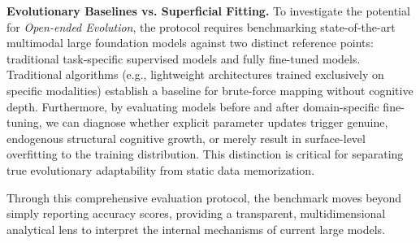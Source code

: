 \textbf{Evolutionary Baselines vs. Superficial Fitting.} 
To investigate the potential for \textit{Open-ended Evolution}, the protocol requires benchmarking state-of-the-art multimodal large foundation models against two distinct reference points: traditional task-specific supervised models and fully fine-tuned models. Traditional algorithms (e.g., lightweight architectures trained exclusively on specific modalities) establish a baseline for brute-force mapping without cognitive depth. Furthermore, by evaluating models before and after domain-specific fine-tuning, we can diagnose whether explicit parameter updates trigger genuine, endogenous structural cognitive growth, or merely result in surface-level overfitting to the training distribution. This distinction is critical for separating true evolutionary adaptability from static data memorization.


Through this comprehensive evaluation protocol, the benchmark moves beyond simply reporting accuracy scores, providing a transparent, multidimensional analytical lens to interpret the internal  mechanisms of current large models.